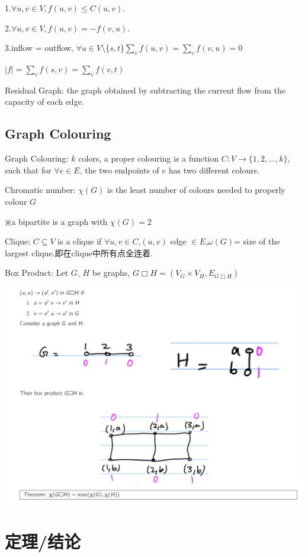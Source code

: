 \documentclass[12pt,a4paper]{ctexrep}
\begin{document}
1.$\forall u,v \in V, f(u,v)\leq C(u,v)$. 

2.$\forall u,v \in V, f(u,v) = -f(v,u)$. 

3.inflow = outflow, $\forall u \in V\setminus \{s,t\} \sum_{v} f(u,v) = \sum_{v} f(v,u) = 0$

$|f| = \sum_{v} f(s,v) = \sum_{v} f(v,t)$

Residual Graph: the graph obtained by subtracting the current flow from the capacity of each edge.
\subsection{Graph Colouring}
Graph Colouring: $k$ colors, a proper colouring is a function $C: V\rightarrow \{1,2,\dots,k\}$, such that for $\forall e \in E$, the two endpoints of $e$ has two different colours.

Chromatic number: $\chi(G)$ is the least number of colours needed to properly colour $G$

$\divideontimes$a bipartite is a graph with $\chi(G)=2$

Clique: $C\subseteq V$ is a clique if $\forall u,v \in C$,$(u,v)$ edge $\in E$,$\omega(G)$= size of the largest clique.即在clique中所有点全连着.

Box Product: Let $G$, $H$ be graphs, $G\Box H =(V_{G} \times V_{H},E_{G \Box H})$

\begin{center}
\includegraphics[scale=0.3]{Box_Product.png}
\end{center}
\section{定理/结论}
\end{document}
